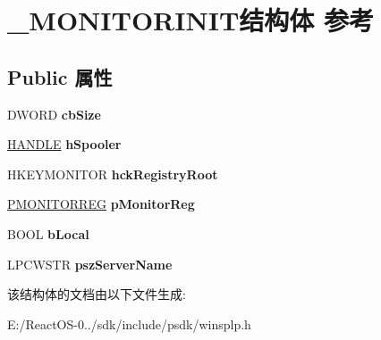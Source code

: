 \hypertarget{struct___m_o_n_i_t_o_r_i_n_i_t}{}\section{\+\_\+\+M\+O\+N\+I\+T\+O\+R\+I\+N\+I\+T结构体 参考}
\label{struct___m_o_n_i_t_o_r_i_n_i_t}
\subsection*{Public 属性}
\begin{DoxyCompactItemize}
\item 
\mbox{\label{struct___m_o_n_i_t_o_r_i_n_i_t_ab029ae286c4f76eb2ee0cac3dad6020c}} 
D\+W\+O\+RD {\bfseries cb\+Size}
\item 
\mbox{\label{struct___m_o_n_i_t_o_r_i_n_i_t_a780d0262ff461320d8f7ed1d15ba8a30}} 
\hyperlink{interfacevoid}{H\+A\+N\+D\+LE} {\bfseries h\+Spooler}
\item 
\mbox{\label{struct___m_o_n_i_t_o_r_i_n_i_t_ace6997a7d1b3694211c9067a045a6189}} 
H\+K\+E\+Y\+M\+O\+N\+I\+T\+OR {\bfseries hck\+Registry\+Root}
\item 
\mbox{\label{struct___m_o_n_i_t_o_r_i_n_i_t_add32e38a082e1e54743e24a86cb827ed}} 
\hyperlink{struct___m_o_n_i_t_o_r_r_e_g}{P\+M\+O\+N\+I\+T\+O\+R\+R\+EG} {\bfseries p\+Monitor\+Reg}
\item 
\mbox{\label{struct___m_o_n_i_t_o_r_i_n_i_t_a5e75f5299c9e647ab7cb4b5b0c1699f9}} 
B\+O\+OL {\bfseries b\+Local}
\item 
\mbox{\label{struct___m_o_n_i_t_o_r_i_n_i_t_af5d7c3a6ab6c7bdd3f264fb0c53dbd6b}} 
L\+P\+C\+W\+S\+TR {\bfseries psz\+Server\+Name}
\end{DoxyCompactItemize}


该结构体的文档由以下文件生成\+:\begin{DoxyCompactItemize}
\item 
E\+:/\+React\+O\+S-\/0../sdk/include/psdk/winsplp.\+h\end{DoxyCompactItemize}
